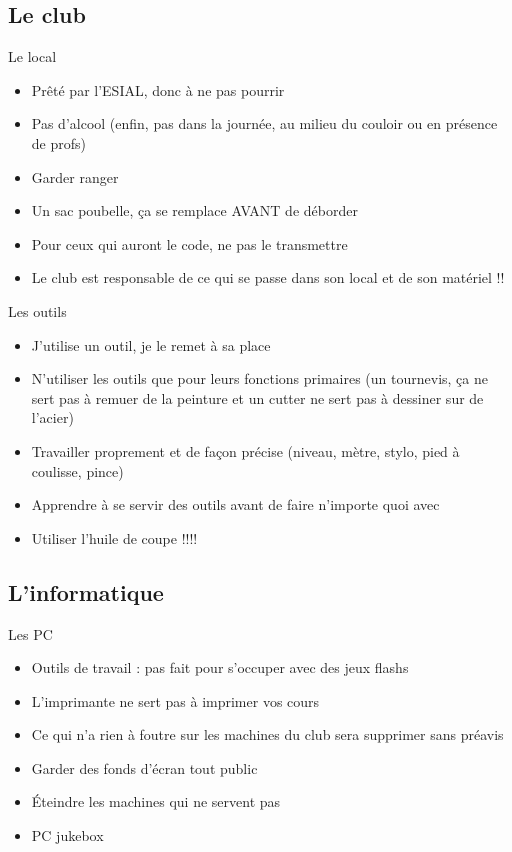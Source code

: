 \documentclass{beamer}
\begin{document}
\subsection{Le club}
\begin{frame}{Le local}
	\begin{itemize}
		\item Prêté par l'ESIAL, donc à ne pas pourrir
		\item Pas d'alcool (enfin, pas dans la journée, au milieu du couloir ou en présence de profs)
		\item Garder ranger
		\item Un sac poubelle, ça se remplace AVANT de déborder
		\item Pour ceux qui auront le code, ne pas le transmettre
		\item Le club est responsable de ce qui se passe dans son local et de son matériel !!
	\end{itemize}
\end{frame}

\begin{frame}{Les outils}
	\begin{itemize}
		\item J'utilise un outil, je le remet à sa place
		\item N'utiliser les outils que pour leurs fonctions primaires (un tournevis, ça ne sert pas à remuer de la peinture et un cutter ne sert pas à dessiner sur de l'acier)
		\item Travailler proprement et de façon précise (niveau, mètre, stylo, pied à coulisse, pince)
		\item Apprendre à se servir des outils avant de faire n'importe quoi avec
		\item Utiliser l'huile de coupe !!!!
	\end{itemize}
\end{frame}

\subsection{L'informatique}
\begin{frame}{Les PC}
	\begin{itemize}
		\item Outils de travail : pas fait pour s'occuper avec des jeux flashs
		\item L'imprimante ne sert pas à imprimer vos cours
		\item Ce qui n'a rien à foutre sur les machines du club sera supprimer sans préavis
		\item Garder des fonds d'écran tout public
		\item \'Eteindre les machines qui ne servent pas
		\item PC jukebox
	\end{itemize}
\end{frame}
\end{document}
